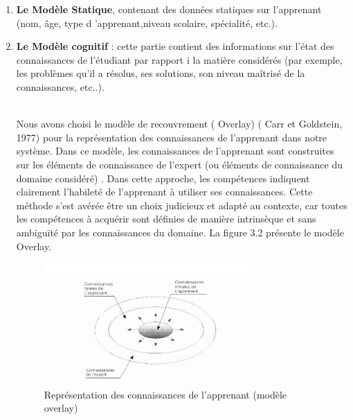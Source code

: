 \begin{enumerate}
\item  \textbf{Le Modèle Statique}, contenant des données statiques sur l'apprenant (nom, âge, type d 'apprenant,niveau scolaire, spécialité,  etc.).
\item  \textbf{Le Modèle cognitif} :  cette partie contient des informations sur l'état des connaissances de l'étudiant par rapport i la matière considérés (par exemple, les problèmes qu'il a résolus,
ses solutions, son niveau maîtrisé de la connaissances, etc..).\\\

Nous avons choisi le modèle de recouvrement ( Overlay) ( Carr et Goldstein, 1977) pour la représentation des connaissances de l'apprenant dans notre système. Dans ce modèle, les connaissances de l'apprenant sont construites sur les éléments de connaissance de l'expert (ou éléments de connaissance du domaine considéré) . Dans cette approche, les compétences indiquent clairement l'habileté de l'apprenant à utiliser ses connaissances. Cette méthode s'est avérée être un choix judicieux et adapté au contexte, car toutes les compétences à acquérir sont définies de manière intrinsèque et sans ambiguïté par les connaissances du domaine. La figure 3.2 présente le modèle Overlay. 

\begin{figure}
    \centering
    \includegraphics[width=0.75\textwidth]{figures/con1.PNG}
    \captionsetup{justification=centering}
    \caption{Représentation des connaissances de l'apprenant (modèle overlay)}
 \label{fig:2}
\end{figure}
\\\


\end{enumerate}
